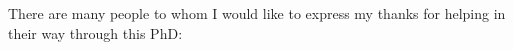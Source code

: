 \cleardoublepage


\begin{acknowledgements}
\setlength{\parskip}{0.5 ex plus 0.5ex minus 0.2ex}
\setlength{\parindent}{2em}
There are many people to whom I would like to express my thanks for helping in their way through this PhD:



\end{acknowledgements}